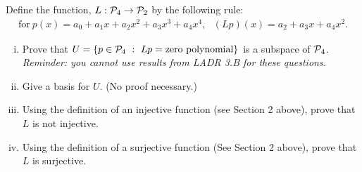 \begin{question}

	\normalfont

	Define the function, $L:\P_4\to \P_2$ by the following rule:
	\begin{align*}
		\text{for}\ p(x) = a_0 + a_1x + a_2x^2 + a_3x^3 + a_4 x^4,\ \ \
		(Lp)(x) = a_2 + a_3 x + a_4 x^2.
	\end{align*}


	\begin{enumerate}[(i)]

		\item Prove that $U=\{p\in\P_4\ :\ Lp = \text{zero polynomial}\}$ is a subspace of $\P_4$. \\
		      \emph{Reminder: you cannot use results from LADR 3.B for these questions.}

		\item Give a basis for $U$. (No proof necessary.)

		\item Using the definition of an injective function (see Section 2 above), prove that $L$ is not injective.

		\item Using the definition of a surjective function (See Section 2 above), prove that $L$ is surjective.
	\end{enumerate}
\end{question}

